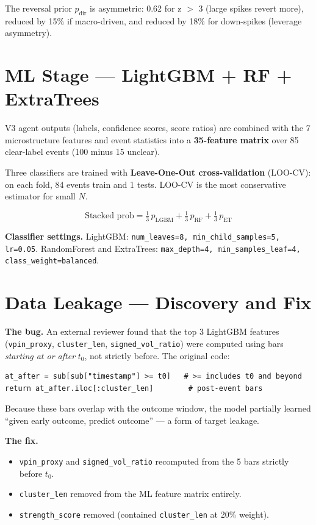 \documentclass[11pt, a4paper]{article}
\begin{document}
The reversal prior $p_\text{dir}$ is asymmetric: 0.62 for z $>$ 3 (large spikes revert more), reduced by 15\% if macro-driven, and reduced by 18\% for down-spikes (leverage asymmetry).

\section{ML Stage — LightGBM + RF + ExtraTrees}

V3 agent outputs (labels, confidence scores, score ratios) are combined with the 7 microstructure features and event statistics into a \textbf{35-feature matrix} over 85 clear-label events (100 minus 15 unclear).

Three classifiers are trained with \textbf{Leave-One-Out cross-validation} (LOO-CV): on each fold, 84 events train and 1 tests. LOO-CV is the most conservative estimator for small $N$.

\[
\text{Stacked prob} = \tfrac{1}{3}\,p_\text{LGBM} + \tfrac{1}{3}\,p_\text{RF} + \tfrac{1}{3}\,p_\text{ET}
\]

\textbf{Classifier settings.} LightGBM: \texttt{num\_leaves=8, min\_child\_samples=5, lr=0.05}. RandomForest and ExtraTrees: \texttt{max\_depth=4, min\_samples\_leaf=4, class\_weight=balanced}.

\section{Data Leakage — Discovery and Fix}

\textbf{The bug.} An external reviewer found that the top 3 LightGBM features (\texttt{vpin\_proxy}, \texttt{cluster\_len}, \texttt{signed\_vol\_ratio}) were computed using bars \emph{starting at or after} $t_0$, not strictly before. The original code:

\begin{verbatim}
at_after = sub[sub["timestamp"] >= t0]   # >= includes t0 and beyond
return at_after.iloc[:cluster_len]        # post-event bars
\end{verbatim}

Because these bars overlap with the outcome window, the model partially learned ``given early outcome, predict outcome'' — a form of target leakage.

\textbf{The fix.}
\begin{itemize}[leftmargin=1.5em, itemsep=2pt]
    \item \texttt{vpin\_proxy} and \texttt{signed\_vol\_ratio} recomputed from the 5 bars strictly before $t_0$.
    \item \texttt{cluster\_len} removed from the ML feature matrix entirely.
    \item \texttt{strength\_score} removed (contained \texttt{cluster\_len} at 20\% weight).
\end{itemize}
\end{document}
